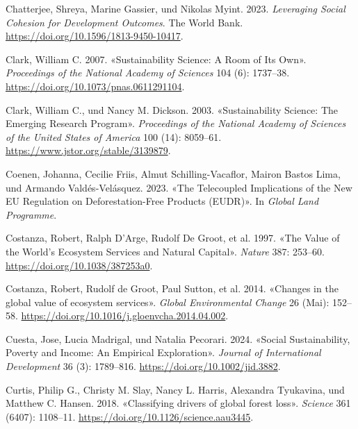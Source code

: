 \documentclass[
  nswissgerman,
  a4paper,
  DIV=11,
  numbers=noendperiod,
  oneside,
  openany]{scrreprt}
\newlength{\cslhangindent}
\newenvironment{CSLReferences}[2] %
 {\begin{list}{}{%
  \setlength{\itemindent}{0pt}
  \setlength{\leftmargin}{0pt}
  \setlength{\parsep}{0pt}
  \ifodd #1
   \setlength{\leftmargin}{\cslhangindent}
   \setlength{\itemindent}{-1\cslhangindent}
  \fi
  \setlength{\itemsep}{#2\baselineskip}}}
 {\end{list}}
\begin{document}
\begin{CSLReferences}{1}{1}
Chatterjee, Shreya, Marine Gassier, und Nikolas Myint. 2023.
\emph{Leveraging {Social Cohesion} for {Development Outcomes}}. The
World Bank. \url{https://doi.org/10.1596/1813-9450-10417}.

Clark, William C. 2007. {«Sustainability {Science}: {A} Room of Its
Own»}. \emph{Proceedings of the National Academy of Sciences} 104 (6):
1737--38. \url{https://doi.org/10.1073/pnas.0611291104}.

Clark, William C., und Nancy M. Dickson. 2003. {«Sustainability
{Science}: {The Emerging Research Program}»}. \emph{Proceedings of the
National Academy of Sciences of the United States of America} 100 (14):
8059--61. \url{https://www.jstor.org/stable/3139879}.

Coenen, Johanna, Cecilie Friis, Almut Schilling-Vacaflor, Mairon Bastos
Lima, und Armando Valdés-Velásquez. 2023. {«The Telecoupled Implications
of the New {EU Regulation} on Deforestation-Free Products ({EUDR})»}. In
\emph{Global Land Programme}.

Costanza, Robert, Ralph D'Arge, Rudolf De Groot, et al. 1997. {«The
{Value} of the {World}'s {Ecosystem} {Services} and {Natural}
{Capital}»}. \emph{Nature} 387: 253--60.
\url{https://doi.org/10.1038/387253a0}.

Costanza, Robert, Rudolf de Groot, Paul Sutton, et al. 2014. {«Changes
in the global value of ecosystem services»}. \emph{Global Environmental
Change} 26 (Mai): 152--58.
\url{https://doi.org/10.1016/j.gloenvcha.2014.04.002}.

Cuesta, Jose, Lucia Madrigal, und Natalia Pecorari. 2024. {«Social
Sustainability, Poverty and Income: {An} Empirical Exploration»}.
\emph{Journal of International Development} 36 (3): 1789--816.
\url{https://doi.org/10.1002/jid.3882}.

Curtis, Philip G., Christy M. Slay, Nancy L. Harris, Alexandra
Tyukavina, und Matthew C. Hansen. 2018. {«Classifying drivers of global
forest loss»}. \emph{Science} 361 (6407): 1108--11.
\url{https://doi.org/10.1126/science.aau3445}.


\end{CSLReferences}
\end{document}

